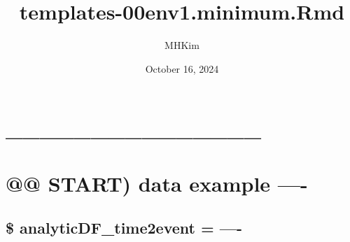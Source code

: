 \documentclass[
]{article}
\title{templates-00env1.minimum.Rmd}
\author{MHKim}
\date{October 16, 2024}
\begin{document}
\maketitle

{
\setcounter{tocdepth}{6}
\tableofcontents
}
\hypertarget{section}{%
\section{\_\_\_\_\_\_\_\_\_\_\_\_\_\_\_}\label{section}}

\hypertarget{start-data-example--}{%
\section{@@ START) data example ----}\label{start-data-example--}}

\hypertarget{analyticdf_time2event--}{%
\subsection{\$ analyticDF\_time2event =
----}\label{analyticdf_time2event--}}
\end{document}
